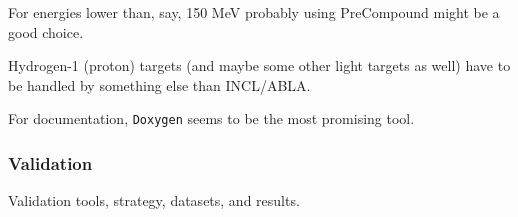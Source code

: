 \begin{appendix}
For energies lower than, say, 150 MeV probably using PreCompound might
be a good choice.

Hydrogen-1 (proton) targets (and maybe some other light targets as
well) have to be handled by something else than INCL/ABLA.

For documentation, {\tt Doxygen} seems to be the most promising tool.

\subsubsection{Validation}

Validation tools, strategy, datasets, and results.






\end{appendix}
